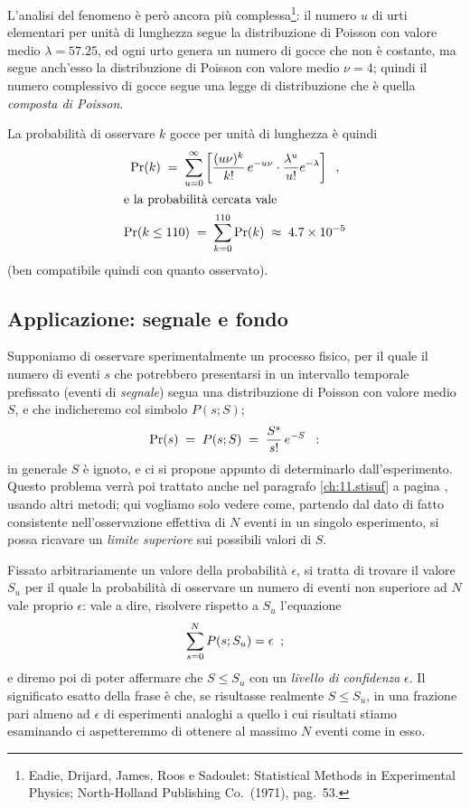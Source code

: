 L'analisi del fenomeno \`e per\`o ancora pi\`u
complessa\/\footnote{Eadie, Drijard, James, Roos e Sadoulet:
  Statistical Methods in Experimental Physics; North-Holland
  Publishing Co.\ (1971), pag.~53.}: il numero $u$ di urti
elementari per unit\`a di lunghezza segue la distribuzione
di Poisson con valore medio $\lambda=57.25$, ed ogni urto
genera un numero di gocce che non \`e costante, ma segue
anch'esso la distribuzione di Poisson con valore medio
$\nu=4$; quindi il numero complessivo di gocce segue una
legge di distribuzione che \`e quella \emph{composta di
  Poisson}.

La probabilit\`a di osservare $k$ gocce per unit\`a di
lunghezza \`e quindi
\begin{gather*}
  \Pr(k) \; = \; \sum_{u=0}^\infty \left[ \frac{ (u \nu)^k
      }{ k! } \, e^{- u \nu} \cdot \frac{ \lambda^u }{ u! }
    e^{- \lambda} \right] \;\; , \\
  \intertext{e la probabilit\`a cercata vale}
  \Pr (k \le 110) \; = \; \sum_{k=0}^{110} \Pr(k) \; \approx
  \; 4.7 \times 10^{-5}
\end{gather*}
(ben compatibile quindi con quanto osservato).

\subsection{Applicazione: segnale e fondo}
Supponiamo di osservare sperimentalmente un processo fisico,
per il quale il numero di eventi $s$ che potrebbero
presentarsi in un intervallo temporale prefissato (eventi di
\emph{segnale}) segua una distribuzione di Poisson con valore
medio $S$, e che indicheremo col simbolo $P(s; S)$;
\begin{equation*}
  \Pr(s) \; = \; P(s; S) \; = \; \frac{S^s}{s!} \, e^{-S}
  \;\; :
\end{equation*}
in generale $S$ \`e ignoto, e ci si propone appunto di
determinarlo dall'esperimento.  Questo problema verr\`a poi
trattato anche nel paragrafo \ref{ch:11.stisuf} a pagina
\pageref{ch:11.stisuf}, usando altri metodi; qui vogliamo
solo vedere come, partendo dal dato di fatto consistente
nell'osservazione effettiva di $N$ eventi in un singolo
esperimento, si possa ricavare un \emph{limite superiore}
sui possibili valori di $S$.

Fissato arbitrariamente un valore della probabilit\`a
$\epsilon$, si tratta di trovare il valore $S_u$ per il
quale la probabilit\`a di osservare un numero di eventi non
superiore ad $N$ vale proprio $\epsilon$: vale a dire,
risolvere rispetto a $S_u$ l'equazione
\begin{equation*}
  \sum_{s=0}^N P(s; S_u) = \epsilon \;\; ;
\end{equation*}
e diremo poi di poter affermare che $S \leq S_u$ con un
\emph{livello di confidenza} $\epsilon$.  Il significato
esatto della frase \`e che, se risultasse realmente $S \leq
S_u$, in una frazione pari almeno ad $\epsilon$ di
esperimenti analoghi a quello i cui risultati stiamo
esaminando ci aspetteremmo di ottenere al massimo $N$ eventi
come in esso.

